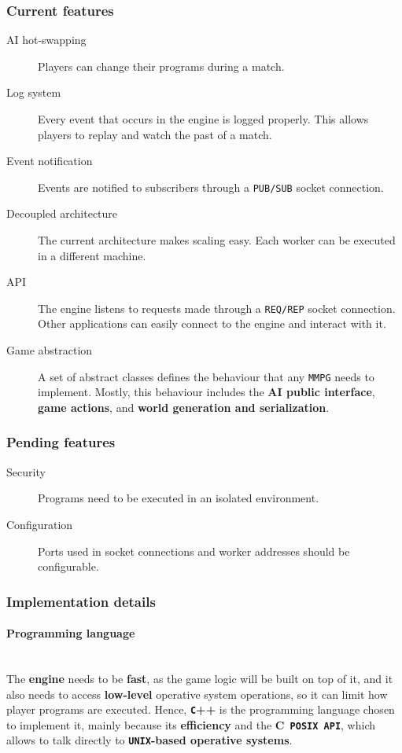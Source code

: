 \documentclass[a4paper,11pt]{article}
\begin{document}
\subsubsection{Current features}
\begin{description}
\item[AI hot-swapping]
Players can change their programs during a match.
\item[Log system]
Every event that occurs in the engine is logged properly. This allows players to replay and
  watch the past of a match.
\item[Event notification]
Events are notified to subscribers through a \texttt{PUB/SUB} socket connection.
\item[Decoupled architecture]
The current architecture makes scaling easy. Each worker can be executed in a
  different machine.
\item[API]
The engine listens to requests made through a \texttt{REQ/REP} socket connection. Other applications can
  easily connect to the engine and interact with it.
\item[Game abstraction]
A set of abstract classes defines the behaviour that any \texttt{MMPG} needs to implement.
  Mostly, this behaviour includes the \textbf{AI public interface}, \textbf{game actions}, and \textbf{world generation and
  serialization}.
\end{description}
\subsubsection{Pending features}
\begin{description}
\item[Security]
Programs need to be executed in an isolated environment.
\item[Configuration]
Ports used in socket connections and worker addresses should be configurable.
\end{description}
\subsubsection{Implementation details}
\paragraph{Programming language}
\hfill
\\[0.2cm]
\indent
The \textbf{engine} needs to be \textbf{fast}, as the game logic will be built on top of it, and it also needs to access
\textbf{low-level} operative system operations, so it can limit how player programs are executed. Hence, \textbf{\texttt{C}++} is the
programming language chosen to implement it, mainly because its \textbf{efficiency} and the \textbf{\texttt{}C\texttt{ POSIX API}}, which allows
to talk directly to \textbf{\texttt{UNIX}-based operative systems}.
\end{document}
